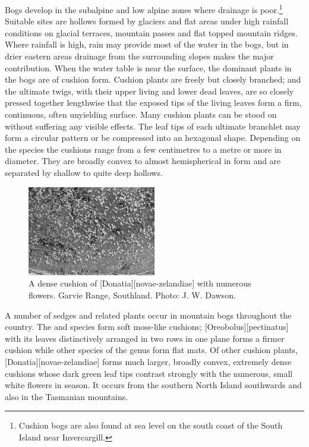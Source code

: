 Bogs develop in the subalpine and low alpine zones where drainage is poor.\footnote{Cushion bogs are also found at sea level on the south coast of the South Island near Invercargill.}
Suitable sites are hollows formed by glaciers and flat areas under high rainfall conditions on glacial terraces, mountain passes and flat topped mountain ridges.
Where rainfall is high, rain may provide most of the water in the bogs, but in drier eastern areas drainage from the surrounding slopes makes the major contribution.
When the water table is near the surface, the dominant plants in the bogs are of cushion form.
Cushion plants are freely but closely branched; and the ultimate twigs, with their upper living and lower dead leaves, are so closely pressed together lengthwise that the exposed tips of the living leaves form a firm, continuous, often unyielding surface.
Many cushion plants can be stood on without suffering any visible effects.
The leaf tips of each ultimate branchlet may form a circular pattern or be compressed into an hexagonal shape.
Depending on the species the cushions range from a few centimetres to a metre or more in diameter.
They are broadly convex to almost hemispherical in form and are separated by shallow to quite deep hollows.

\begin{figure}
	\includegraphics[width=0.5\textwidth]{graphics/figure104donatia.jpg}
	\centering
	\caption[\emph{Donatia novae-zelandiae}]{A dense cushion of [Donatia][novae-zelandiae] with numerous flowers.
	Garvie Range, Southland.
	Photo: J. W. Dawson.}%
	\label{fig:104donatio}
\end{figure}

A number of sedges and related plants occur in mountain bogs throughout the country.
The  and  species form soft moss-like cushions; [Oreobolus][pectinatus] with its leaves distinctively arranged in two rows in one plane forms a firmer cushion while other species of the genus form flat mats.
Of other cushion plants, [Donatia][novae-zelandiae] forms much larger, broadly convex, extremely dense cushions whose dark green leaf tips contrast strongly with the numerous, small white flowers in season.
It occurs from the southern North Island southwards and also in the Tasmanian mountains.

